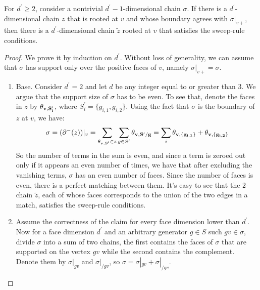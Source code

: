 \begin{claim}
  \label{claim:findcor}
  For $d^{\prime}\ge 2$, consider a nontrivial $d^{\prime}-1$-dimensional chain $\sigma$. If there is a $d^{\prime}$-dimensional chain $z$ that is rooted at $v$ and whose boundary agrees with $\sigma|_{v+}$, then there is a $d^{\prime}$-dimensional chain $\tilde{z}$ rooted at $v$ that satisfies the sweep-rule conditions.
\end{claim}
\begin{proof} 
We prove it by induction on $d^{\prime}$. Without loss of generality, we can assume that $\sigma$ has support only over the positive faces of $v$, namely $\sigma|_{v+} = \sigma$.
  \begin{enumerate}
    \item Base. Consider $d^{\prime} = 2$ and let $d$ be any integer equal to or greater than $3$. We argue that the support size of $\sigma$ has to be even. To see that, denote the faces in $z$ by $\mathbf{\theta_{v ,S^{\prime}_{i}} }$, where $S^{\prime}_{i} = \{g_{i,1},g_{i,2}\}$. Using the fact that $\sigma$ is the boundary of $z$ at $v$, we have:
      \begin{equation*}
        \begin{split}
          \sigma = (\partial^{-}(z))|_{v} = \sum_{ \mathbf{\theta_{v ,S^{\prime}}{} }{} \in z}\sum_{ g \in S^{\prime} } \mathbf{\theta_{v ,S^{\prime } / g } } = \sum_{ i } \mathbf{\theta_{v , \{g_{i,1}\} } }+ \mathbf{\theta_{v , \{g_{i,2}\} } } 
        \end{split}
      \end{equation*}
So the number of terms in the sum is even, and since a term is zeroed out only if it appears an even number of times, we have that after excluding the vanishing terms, $\sigma$ has an even number of faces. Since the number of faces is even, there is a perfect matching between them. It's easy to see that the $2$-chain $\tilde{z}$, each of whose faces corresponds to the union of the two edges in a match, satisfies the sweep-rule conditions.
    \item Assume the correctness of the claim for every face dimension lower than $d^{\prime}$.   Now for a face dimension $d^{\prime}$ and an arbitrary generator $g \in S$ such $gv \in \sigma$, divide $\sigma$ into a sum of two chains, the first contains the faces of $\sigma$ that are supported on the vertex $gv$ while the second contains the complement. Denote them by $\sigma|_{gv}$ and $\sigma|_{/ gv}$, so $\sigma = \sigma|_{gv} + \sigma|_{/ gv}$. 


\end{enumerate}
\end{proof}
